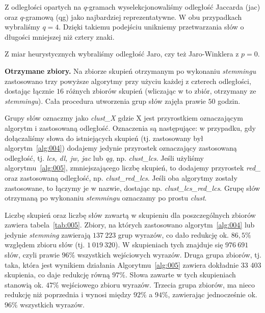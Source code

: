 \documentclass{praca1}
\begin{document}
Z odległości opartych na $q$-gramach wyselekcjonowaliśmy odległość Jaccarda (jac) oraz $q$-gramową (qg) jako najbardziej reprezentatywne. W obu przypadkach wybraliśmy $q=4$. Dzięki takiemu podejściu unikniemy przetwarzania słów o długości mniejszej niż cztery znaki.

Z miar heurystycznych wybraliśmy odległość Jaro, czy też Jaro-Winklera z $p=0$.

\textbf{Otrzymane zbiory.} Na zbiorze skupień otrzymanym po wykonaniu \emph{stemmingu} zastosowano trzy powyższe algorytmy przy użyciu każdej z czterech odległości, dostając łącznie $16$ różnych zbiorów skupień (wliczając w to zbiór, otrzymany ze \emph{stemmingu}). Cała procedura utworzenia grup słów zajęła prawie $50$ godzin. 

Grupy słów oznaczmy jako \emph{clust\_X} gdzie X jest przyrostkiem oznaczającym algorytm i zastosowaną odległość. Oznaczenia są następujące: w przypadku, gdy dołączaliśmy słowa do istniejących skupień (tj. zastosowany był algorytm~\ref{alg:004}) dodajemy jedynie przyrostek oznaczający zastosowaną odległość, tj. \emph{lcs, dl, jw, jac} lub \emph{qg}, np. \emph{clust\_lcs}. Jeśli użyliśmy algorytmu~\ref{alg:005}, zmniejszającego liczbę skupień, to dodajemy przyrostek \emph{red\_} oraz zastosowaną odległość, np. \emph{clust\_red\_lcs}. Jeśli oba algorytmy zostały zastosowane, to łączymy je w nazwie, dostając np. \emph{clust\_lcs\_red\_lcs}. Grupę słów otrzymaną po wykonaniu \emph{stemmingu} oznaczamy po prostu \emph{clust}. 


Liczbę skupień oraz liczbę słów zawartą w skupieniu dla poszczególnych zbiorów zawiera tabela~\ref{tab:005}. Zbiory, na których zastosowano algorytm~\ref{alg:004} lub jedynie \emph{stemming} zawierają $137\ 223$ grup wyrazów, co dało redukcję ok. $86,5\%$ względem zbioru słów (tj. $1\ 019\ 320$). W skupieniach tych znajduje się $976\ 691$ słów, czyli prawie $96\%$  wszystkich wejściowych wyrazów. Druga grupa zbiorów, tj. taka, która jest wynikiem działania Algorytmu~\ref{alg:005} zawiera dokładnie 33 403 skupienia, co daje redukcję równą $97\%$. Słowa zawarte w tych skupieniach stanowią ok. $47\%$ wejściowego zbioru wyrazów. Trzecia grupa zbiorów, ma nieco redukcję niż poprzednia i wynosi między $92\%$ a $94\%$, zawierając jednocześnie ok. $96\%$ wszystkich wyrazów.
\end{document}
